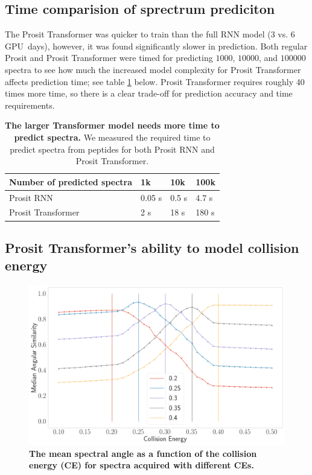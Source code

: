\documentclass[10pt,a4paper]{article}
\begin{document}
\subsection*{Time comparision of sprectrum prediciton}

The Prosit Transformer was quicker to train than the full RNN model (3 vs. 6 GPU~days), however, it was found significantly slower in prediction. Both regular Prosit and Prosit Transformer were timed for predicting $1000$, $10000$, and $100000$ spectra to see how much the increased model complexity for Prosit Transformer affects prediction time; see table \ref{tab:predictionTime} below. Prosit Transformer requires roughly 40 times more time, so there is a clear trade-off for prediction accuracy and time requirements. 

\begin{table}[htbp]
    \caption{{\bf The larger Transformer model needs more time to predict spectra.} We measured the required time to predict spectra from peptides for both Prosit RNN and Prosit Transformer.}
      \begin{tabular}{l|lll}
      \hline
      Number of predicted spectra & 1k & 10k  & 100k \\
      \hline
      Prosit RNN & 0.05 s & 0.5 s  & 4.7 s \\
      Prosit Transformer & 2 s    & 18 s   & 180 s \\
      \hline
      \end{tabular}%
    \label{tab:predictionTime}%
  \end{table}%
  

\subsection*{Prosit Transformer’s ability to model collision energy}

\begin{figure}[ht!]
    \centering
    \includegraphics[width=12cm]{./img/ce_calibration.png}
    \caption{{\bf The mean spectral angle as a function of the collision energy (CE) for spectra acquired with different CEs.}\label{fig:ce}}
\end{figure}
    
\end{document}
